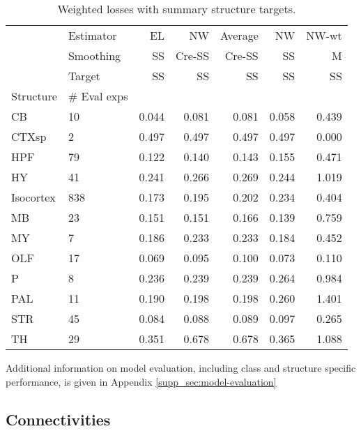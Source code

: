 \begin{table}[H]
\scriptsize

\begin{tabular}{ll|rrrrr}
\toprule
   & Estimator &     EL &     NW & Average &     NW &  NW-wt \\
   & Smoothing &     SS & Cre-SS &  Cre-SS &     SS &      M \\
   & Target &     SS &     SS &      SS &     SS &     SS \\
Structure & \# Eval exps &        &        &         &        &        \\
\midrule
\hline
CB & 10 &  0.044 &  0.081 &   0.081 &  0.058 &  0.439 \\
CTXsp & 2 &  0.497 &  0.497 &   0.497 &  0.497 &  0.000 \\
HPF & 79 &  0.122 &  0.140 &   0.143 &  0.155 &  0.471 \\
HY & 41 &  0.241 &  0.266 &   0.269 &  0.244 &  1.019 \\
Isocortex & 838 &  0.173 &  0.195 &   0.202 &  0.234 &  0.404 \\
MB & 23 &  0.151 &  0.151 &   0.166 &  0.139 &  0.759 \\
MY & 7 &  0.186 &  0.233 &   0.233 &  0.184 &  0.452 \\
OLF & 17 &  0.069 &  0.095 &   0.100 &  0.073 &  0.110 \\
P & 8 &  0.236 &  0.239 &   0.239 &  0.264 &  0.984 \\
PAL & 11 &  0.190 &  0.198 &   0.198 &  0.260 &  1.401 \\
STR & 45 &  0.084 &  0.088 &   0.089 &  0.097 &  0.265 \\
TH & 29 &  0.351 &  0.678 &   0.678 &  0.365 &  1.088 \\
\bottomrule
\end{tabular}
\caption{Weighted losses with summary structure targets.}
\end{table}

Additional information on model evaluation, including class and structure specific performance, is given in Appendix \ref{supp_sec:model-evaluation}

\newpage

\subsection{Connectivities}

